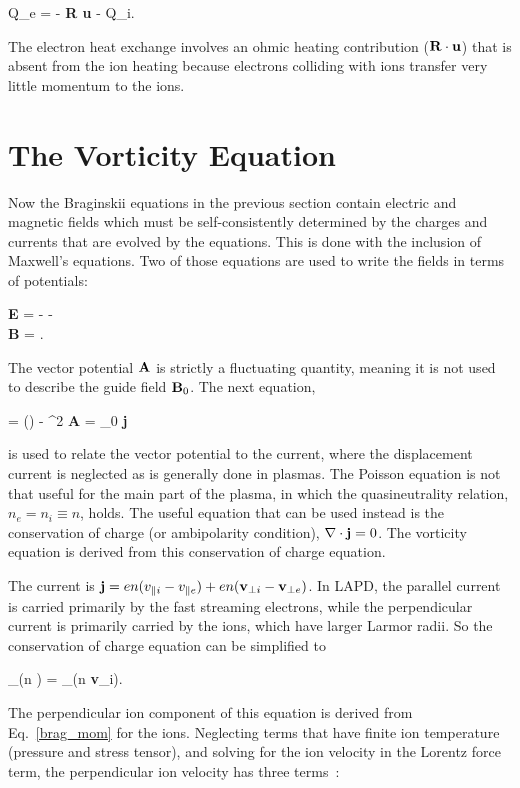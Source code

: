 \beq
\label{electron_heat_exchange}
Q_e = - {\bf R \cdot u} - Q_i.
\eeq

The electron heat exchange involves an ohmic heating contribution (${\bf R \cdot u}$) that is absent from the ion heating because electrons colliding with ions transfer very
little momentum to the ions.

\section{The Vorticity Equation}
\label{s_vorticity_eqn}

Now the Braginskii equations in the previous section contain electric and magnetic fields which must be self-consistently determined by the charges and currents that are evolved by the equations. 
This is done with the inclusion of Maxwell's equations. Two of those equations are used to write the fields in terms of potentials:

\beqar
\label{gauge}
{\bf E} = - \grad \phi -  \\ \nonumber
{\bf B} = \nabla {}.
\eeqar

The vector potential ${\bf A}$ is strictly a fluctuating quantity, meaning it is not used to describe the guide field ${\bf B}_0$.
The next equation,

\beq
\label{maxwell}
\grad {} = \grad(\grad {}) - \grad^2 {\bf A} = \mu_0 {\bf j}
\eeq

is used to relate the vector potential to the current, where the displacement current is neglected as is generally done in plasmas. The Poisson equation is not that useful for the main part
of the plasma, in which the quasineutrality relation, $n_e = n_i \equiv n$, holds. The useful equation that can be used instead is the conservation of charge (or ambipolarity condition), 
$\nabla \cdot {\bf j} = 0$. The vorticity equation is derived from this conservation of charge equation.

The current is ${\bf j} = e n (v_{\parallel i} - v_{\parallel e}) + e n ({\bf v}_{\perp i} - {\bf v}_{\perp e}) $. In LAPD, the parallel current is carried primarily by the fast streaming electrons, while the
perpendicular current is primarily carried by the ions, which have larger Larmor radii. So the conservation of charge equation can be simplified to

\beq
\label{simp_charge_cons}
\nabla_\para (n \vpe) = \nabla_\perp \cdot (n {\bf v}_{\perp i}).
\eeq

The perpendicular ion component of this equation is derived from Eq.~\ref{brag_mom} for the ions. Neglecting terms that have finite ion temperature (pressure and stress tensor), and solving
for the ion velocity in the Lorentz force term, the perpendicular ion velocity has three terms~\cite{Popovich2010a,simakov2003}:


